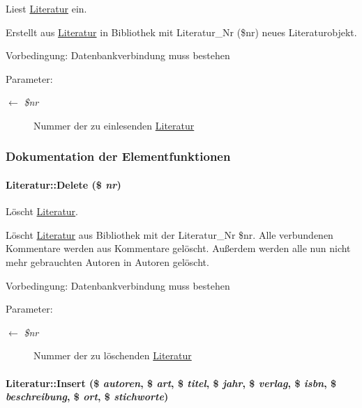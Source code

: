 Liest \hyperlink{classLiteratur}{Literatur} ein. 

Erstellt aus \hyperlink{classLiteratur}{Literatur} in Bibliothek mit Literatur\_\-Nr (\$nr) neues Literaturobjekt. \begin{Desc}
\item[Vorbedingung:]Datenbankverbindung muss bestehen \end{Desc}
\begin{Desc}
\item[Parameter:]
\begin{description}
\item[\mbox{$\leftarrow$} {\em \$nr}]Nummer der zu einlesenden \hyperlink{classLiteratur}{Literatur}\end{description}
\end{Desc}


\subsubsection{Dokumentation der Elementfunktionen}
\hypertarget{classLiteratur_f5b265d349df2a9d17079b81d808fa89}{
\paragraph[Delete]{\setlength{\rightskip}{0pt plus 5cm}Literatur::Delete (\$ {\em nr})}\hfill}
\label{classLiteratur_f5b265d349df2a9d17079b81d808fa89}


Löscht \hyperlink{classLiteratur}{Literatur}. 

Löscht \hyperlink{classLiteratur}{Literatur} aus Bibliothek mit der Literatur\_\-Nr \$nr. Alle verbundenen Kommentare werden aus Kommentare gelöscht. Außerdem werden alle nun nicht mehr gebrauchten Autoren in Autoren gelöscht. \begin{Desc}
\item[Vorbedingung:]Datenbankverbindung muss bestehen \end{Desc}
\begin{Desc}
\item[Parameter:]
\begin{description}
\item[\mbox{$\leftarrow$} {\em \$nr}]Nummer der zu löschenden \hyperlink{classLiteratur}{Literatur}\end{description}
\end{Desc}
\hypertarget{classLiteratur_3347551316e8f73659fc6f32ac6095df}{
\paragraph[Insert]{\setlength{\rightskip}{0pt plus 5cm}Literatur::Insert (\$ {\em autoren}, \$ {\em art}, \$ {\em titel}, \$ {\em jahr}, \$ {\em verlag}, \$ {\em isbn}, \$ {\em beschreibung}, \$ {\em ort}, \$ {\em stichworte})}\hfill}
\label{classLiteratur_3347551316e8f73659fc6f32ac6095df}


